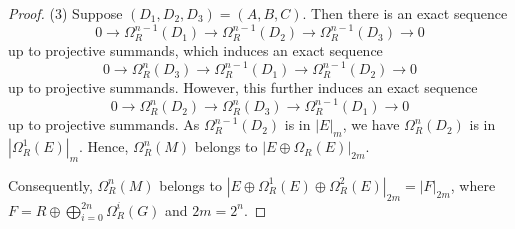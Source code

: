 \documentclass[10pt,a4paper]{amsart}
\begin{document}
\begin{proof}
    (3) Suppose $(D_1,D_2,D_3)=(A,B,C)$. Then there is an exact sequence
    \begin{displaymath}
        0 \to \Omega_R^{n-1} (D_1) \to \Omega_R^{n-1} (D_2) \to \Omega_R^{n-1} (D_3) \to 0
    \end{displaymath}
    up to projective summands, which induces an exact sequence
    \begin{displaymath}
        0 \to \Omega_R^n (D_3) \to \Omega_R^{n-1} (D_1) \to \Omega_R^{n-1} (D_2) \to 0
    \end{displaymath}
    up to projective summands. However, this further induces an exact sequence
    \begin{displaymath}
        0 \to \Omega_R^n (D_2) \to \Omega_R^n (D_3) \to \Omega_R^{n-1} (D_1) \to 0
    \end{displaymath}
    up to projective summands. As $\Omega_R^{n-1} (D_2)$ is in $|E|_m$, we have
    $\Omega_R^n (D_2)$ is in $|\Omega_R^1 (E)|_m$. Hence, $\Omega_R^n (M)$ belongs to $|E\oplus\Omega_R (E)|_{2m}$.

    Consequently, $\Omega_R^n (M)$ belongs to $|E\oplus\Omega_R^1
    (E)\oplus\Omega_R^2(E)|_{2m}=|F|_{2m}$, where $F=R\oplus\bigoplus_{i=0}^{2n}\Omega_R^i (G)$ and $2m=2^n$.
\end{proof}
\end{document}
